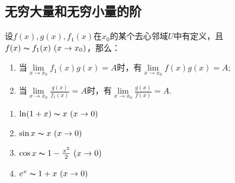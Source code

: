 	\subsection{无穷大量和无穷小量的阶}
	\begin{definition}[无穷小量]
		
	\end{definition}
	\begin{definition}[无穷大量]
		
	\end{definition}
	\begin{definition}[等价量]
		
	\end{definition}
	\begin{theorem}[替换定理]
		设$f(x),g(x),f_1(x)$在$x_0$的某个去心邻域$U$中有定义，且$f(x)\thicksim f_1(x)\ (x\rightarrow x_0)$，那么：
		\begin{enumerate}
			\item 当$\lim\limits_{x\rightarrow x_0}f_1(x)g(x)=A$时，有$\lim\limits_{x\rightarrow x_0}f(x)g(x)=A$;
			\item 当$\lim\limits_{x\rightarrow x_0}\frac{g(x)}{f_1(x)}=A$时，有$\lim\limits_{x\rightarrow x_0}\frac{g(x)}{f(x)}=A$.
		\end{enumerate}
	\end{theorem}
	\begin{example}[常见的等价量]
		\begin{enumerate}
			\item $\ln(1+x)\thicksim x\ (x\rightarrow0)$
			\item $\sin x\thicksim x\ (x\rightarrow0)$
			\item $\cos x\thicksim 1-\frac{x^2}{2}\ (x\rightarrow0)$
			\item $e^x\thicksim1+x\ (x\rightarrow0)$
		\end{enumerate}
	\end{example}
